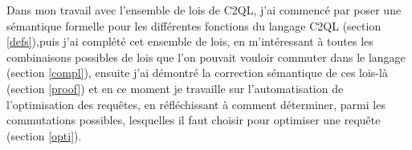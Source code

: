 Dans mon travail avec l'ensemble de lois de C2QL,
j'ai commencé par poser une sémantique formelle pour les différentes fonctions
du langage C2QL (section \ref{defs}),puis j'ai complété cet ensemble de lois,
en m'intéressant à toutes les combinaisons possibles de lois que l'on pouvait
vouloir commuter dans le langage (section \ref{compl}), ensuite 
j'ai démontré la correction sémantique de ces lois-là (section \ref{proof})
et en ce moment je travaille sur l'automatisation de l'optimisation 
des requêtes, en réfléchissant à comment déterminer, parmi les commutations possibles,
lesquelles il faut choisir pour optimiser une requête (section \ref{opti}).